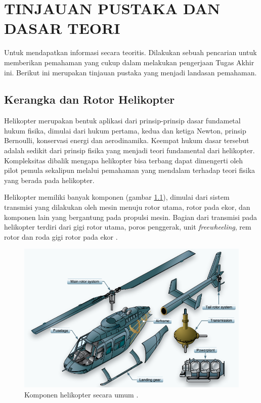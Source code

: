 \chapter{TINJAUAN PUSTAKA DAN DASAR TEORI}
\label{chap:tinjauanpustaka}


Untuk mendapatkan informasi secara teoritis. Dilakukan sebuah pencarian untuk memberikan pemahaman yang cukup dalam melakukan pengerjaan Tugas Akhir ini. Berikut ini merupakan tinjauan pustaka yang menjadi landasan pemahaman.

\section{Kerangka dan Rotor Helikopter}
\label{sec:strukturheli}

Helikopter merupakan bentuk aplikasi dari prinsip-prinsip dasar fundametal hukum fisika, dimulai dari hukum pertama, kedua dan ketiga Newton, prinsip Bernoulli, konservasi energi dan aerodinamika. Keempat hukum dasar tersebut adalah sedikit dari prinsip fisika yang menjadi teori fundamental dari helikopter. Kompleksitas dibalik mengapa helikopter bisa terbang dapat dimengerti oleh pilot pemula sekalipun melalui pemahaman yang mendalam terhadap teori fisika yang berada pada helikopter\cite{wagtendonk2006principles}.

Helikopter memiliki banyak komponen (gambar \ref{fig:komponenheli}), dimulai dari sistem transmisi yang dilakukan oleh mesin menuju rotor utama, rotor pada ekor, dan komponen lain yang bergantung pada propulsi mesin. Bagian dari transmisi pada helikopter terdiri dari gigi rotor utama, poros penggerak, unit \textit{freewheeling}, rem rotor dan roda gigi rotor pada ekor  \cite{wagtendonk2006principles}.

\begin{figure}[H]
	\centering
	\includegraphics[width=0.8\linewidth]{gambar/komponenheli.png}
	\caption{Komponen helikopter secara umum \cite{handbook}.}
	\label{fig:komponenheli}
\end{figure}

